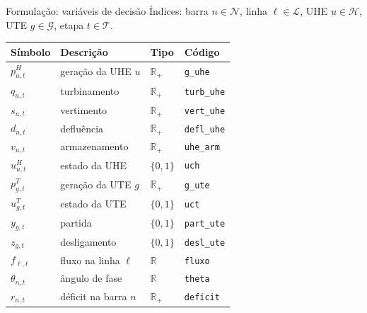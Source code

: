 \documentclass[10pt,aspectratio=169]{beamer}
\newcommand{\Nb}{\mathcal{N}}          %
\newcommand{\Lb}{\mathcal{L}}          %
\newcommand{\Hb}{\mathcal{H}}          %
\newcommand{\Gb}{\mathcal{G}}          %
\newcommand{\Tb}{\mathcal{T}}          %
\newcommand{\pH}{p^{H}}                %
\newcommand{\pT}{p^{T}}                %
\newcommand{\uH}{u^{H}}                %
\newcommand{\uT}{u^{T}}                %
\begin{document}
\begin{frame}{Formulação: variáveis de decisão}
  \small
  Índices: barra $n \in \Nb$, linha $\ell \in \Lb$, UHE $u \in \Hb$,
  UTE $g \in \Gb$, etapa $t \in \Tb$.

  \vspace{0.5em}
  \centering
  \begin{tabular}{llll}
    \toprule
    Símbolo & Descrição & Tipo & Código \\
    \midrule
    $\pH_{u,t}$    & geração da UHE $u$                & $\mathbb{R}_+$    & \texttt{g\_uhe} \\
    $q_{u,t}$      & turbinamento                      & $\mathbb{R}_+$    & \texttt{turb\_uhe} \\
    $s_{u,t}$      & vertimento                        & $\mathbb{R}_+$    & \texttt{vert\_uhe} \\
    $d_{u,t}$      & defluência                        & $\mathbb{R}_+$    & \texttt{defl\_uhe} \\
    $v_{u,t}$      & armazenamento                     & $\mathbb{R}_+$    & \texttt{uhe\_arm} \\
    $\uH_{u,t}$    & estado da UHE                     & $\{0,1\}$         & \texttt{uch} \\
    \midrule
    $\pT_{g,t}$    & geração da UTE $g$                & $\mathbb{R}_+$    & \texttt{g\_ute} \\
    $\uT_{g,t}$    & estado da UTE                     & $\{0,1\}$         & \texttt{uct} \\
    $y_{g,t}$      & partida                           & $\{0,1\}$         & \texttt{part\_ute} \\
    $z_{g,t}$      & desligamento                      & $\{0,1\}$         & \texttt{desl\_ute} \\
    \midrule
    $f_{\ell,t}$   & fluxo na linha $\ell$             & $\mathbb{R}$      & \texttt{fluxo} \\
    $\theta_{n,t}$ & ângulo de fase                    & $\mathbb{R}$      & \texttt{theta} \\
    $r_{n,t}$      & déficit na barra $n$              & $\mathbb{R}_+$    & \texttt{deficit} \\
    \bottomrule
  \end{tabular}
\end{frame}
\end{document}
